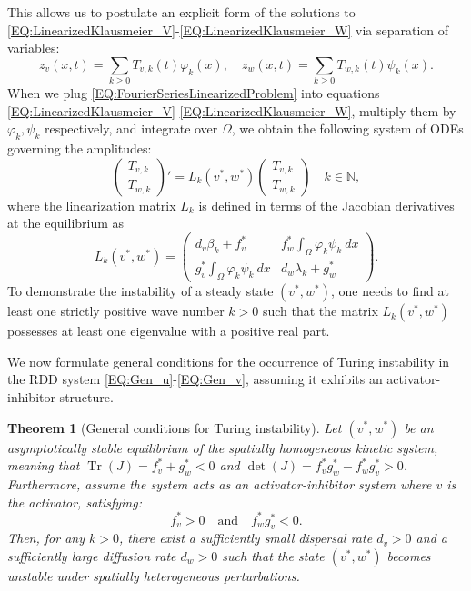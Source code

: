 \documentclass[11pt, a4paper]{article}
\theoremstyle{break}
\newtheorem{thm}{Theorem}[section]
\theoremstyle{break}
\theoremstyle{break}
\theoremstyle{break}
\theoremstyle{break}
\theoremstyle{break}
\theoremstyle{break}
\theoremstyle{break}
\theoremstyle{break}
\theoremstyle{break}
\DeclareMathOperator{\Tr}{Tr}
\begin{document}
This allows us to postulate an explicit form of the solutions to \eqref{EQ:LinearizedKlausmeier_V}-\eqref{EQ:LinearizedKlausmeier_W} via separation of variables:
\begin{equation}
    \label{EQ:FourierSeriesLinearizedProblem}
    z_v(x,t) = \sum_{k \geq 0} T_{v, k}(t) \varphi_k(x), \quad z_w(x,t) = \sum_{k \geq 0} T_{w, k}(t) \psi_k(x).
\end{equation}
When we plug \eqref{EQ:FourierSeriesLinearizedProblem} into equations \eqref{EQ:LinearizedKlausmeier_V}-\eqref{EQ:LinearizedKlausmeier_W}, multiply them by $\varphi_k, \psi_k$ respectively, and integrate over $\Omega$, we obtain the following system of ODEs governing the amplitudes:
\begin{equation}
    \label{EQ:ODEFORT_V_T_W}
    \begin{pmatrix}
        T_{v, k} \\ T_{w, k}
    \end{pmatrix}'
    =
    L_k(v^*, w^*)
    \begin{pmatrix}
        T_{v, k} \\ T_{w, k}
    \end{pmatrix}
    \quad 
    k \in \mathbb{N},
\end{equation}
where the linearization matrix $L_k$ is defined in terms of the Jacobian derivatives at the equilibrium as
\begin{equation}
    \label{EQ:GeneralLinearizationMatrix}
    L_k(v^*, w^*) = 
    \begin{pmatrix}
        d_v \beta_k + f_v^* & f_w^* \int_\Omega \varphi_k \psi_k \:dx \\
        g_v^* \int_\Omega \varphi_k \psi_k \:dx & d_w \lambda_k + g_w^*
    \end{pmatrix}.
\end{equation}
To demonstrate the instability of a steady state $(v^*, w^*)$, one needs to find at least one strictly positive wave number $k > 0$ such that the matrix $L_k(v^*, w^*)$ possesses at least one eigenvalue with a positive real part. 

We now formulate general conditions for the occurrence of Turing instability in the RDD system \eqref{EQ:Gen_u}-\eqref{EQ:Gen_v}, assuming it exhibits an activator-inhibitor structure.

\begin{thm}[General conditions for Turing instability]
    \label{lem:general_turing_instability}
    Let $(v^*, w^*)$ be an asymptotically stable equilibrium of the spatially homogeneous kinetic system, meaning that $\Tr(J) = f_v^* + g_w^* < 0$ and $\det(J) = f_v^* g_w^* - f_w^* g_v^* > 0$. Furthermore, assume the system acts as an activator-inhibitor system where $v$ is the activator, satisfying:
    \begin{equation}
        \label{eq:activator_inhibitor_conditions}
        f_v^* > 0 \quad \text{and} \quad f_w^* g_v^* < 0.
    \end{equation}
    Then, for any $k > 0$, there exist a sufficiently small dispersal rate $d_v > 0$ and a sufficiently large diffusion rate $d_w > 0$ such that the state $(v^*, w^*)$ becomes unstable under spatially heterogeneous perturbations.
\end{thm}
\end{document}

